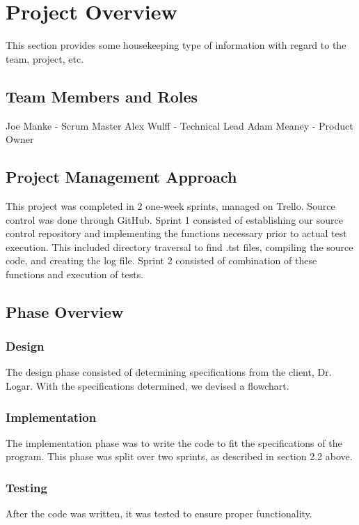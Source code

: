 

\chapter{Project Overview}
This section provides some housekeeping type of information with regard to the 
team, project, etc. 

\section{Team Members and Roles}
Joe Manke - Scrum Master\newline
Alex Wulff - Technical Lead\newline
Adam Meaney - Product Owner

\section{Project  Management Approach}
This project was completed in 2 one-week sprints, managed on Trello.\newline\newline
Source control was done through GitHub.\newline\newline
Sprint 1 consisted of establishing our source control repository and implementing the functions necessary prior to actual test execution. This included directory traversal to find .tst files, compiling the source code, and creating the log file. \newline\newline
Sprint 2 consisted of combination of these functions and execution of tests.

\section{Phase  Overview}

\subsection{Design}
The design phase consisted of determining specifications from the client, Dr. Logar. With the specifications determined, we devised a flowchart.

\subsection{Implementation}
The implementation phase was to write the code to fit the specifications of the program.\newline
This phase was split over two sprints, as described in section 2.2 above.

\subsection{Testing}
After the code was written, it was tested to ensure proper functionality.